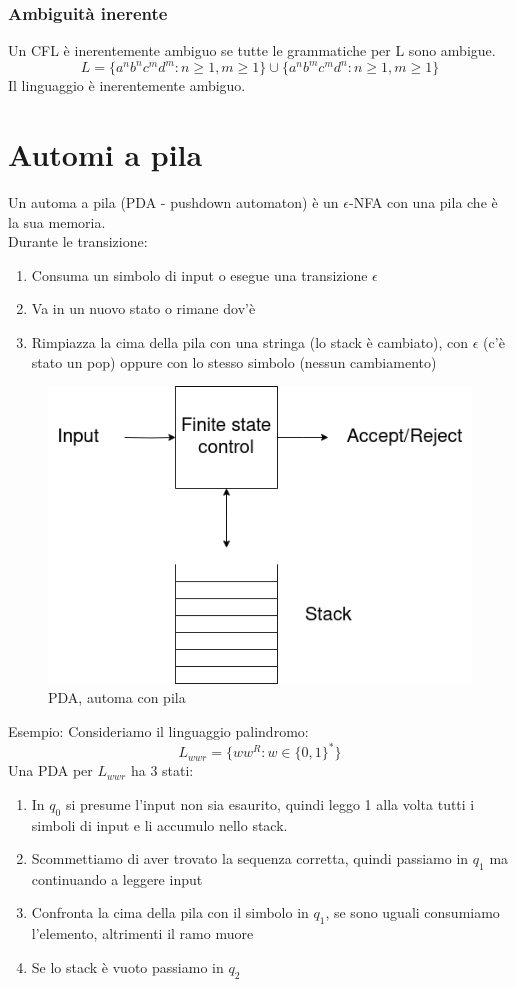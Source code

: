 \documentclass[12pt]{article}
\begin{document}
\subsubsection{Ambiguità inerente} 
Un CFL è inerentemente ambiguo se tutte le grammatiche per L sono ambigue. 
\[ L = \{a^n b^n c^m d^m :n \geq 1, m \geq 1\} \cup \{a^n b^m c^m d^n : n \geq 1, m \geq 1\} \]
Il linguaggio è inerentemente ambiguo.

\section{Automi a pila}
Un automa a pila (PDA - pushdown automaton) è un $\epsilon$-NFA con una pila che è la sua memoria.
\\ Durante le transizione:
\begin{enumerate}
  \item Consuma un simbolo di input o esegue una transizione $\epsilon$
  \item Va in un nuovo stato o rimane dov'è
  \item Rimpiazza la cima della pila con una stringa (lo stack è cambiato), con $\epsilon$ (c'è stato un pop) oppure con lo stesso simbolo (nessun cambiamento)
\end{enumerate}

\begin{figure}[ht]
	\includegraphics[scale = 0.4]{media/pda.png}
	\centering
	\caption{PDA, automa con pila}
\end{figure}
Esempio: Consideriamo il linguaggio palindromo: 
\[ L_{wwr} = \{ ww^R : w \in \{0,1\}^*\}\]
Una PDA per $L_{wwr}$ ha 3 stati: 
\begin{enumerate}
  \item In $q_0$ si presume l'input non sia esaurito, quindi leggo 1 alla volta tutti i simboli di input e li accumulo nello stack.
  \item Scommettiamo di aver trovato la sequenza corretta, quindi passiamo in $q_1$ ma continuando a leggere input
  \item Confronta la cima della pila con il simbolo in $q_1$, se sono uguali consumiamo l'elemento, altrimenti il ramo muore
  \item Se lo stack è vuoto passiamo in $q_2$
\end{enumerate}
\end{document}
